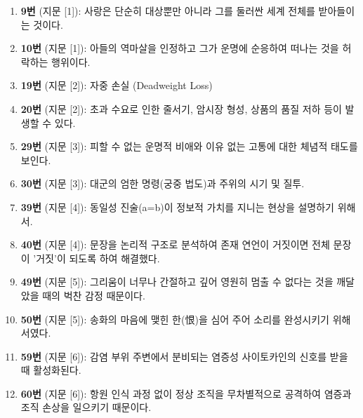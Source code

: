 \documentclass[10pt, a4paper]{article}
\begin{document}
\vspace{2mm}

\begin{enumerate}[label={}, leftmargin=0em, itemsep=2pt]
\item \textbf{9번} (지문 [1]): 사랑은 단순히 대상뿐만 아니라 그를 둘러싼 세계 전체를 받아들이는 것이다.
\item \textbf{10번} (지문 [1]): 아들의 역마살을 인정하고 그가 운명에 순응하여 떠나는 것을 허락하는 행위이다.
\item \textbf{19번} (지문 [2]): 자중 손실 (Deadweight Loss)
\item \textbf{20번} (지문 [2]): 초과 수요로 인한 줄서기, 암시장 형성, 상품의 품질 저하 등이 발생할 수 있다.
\item \textbf{29번} (지문 [3]): 피할 수 없는 운명적 비애와 이유 없는 고통에 대한 체념적 태도를 보인다.
\item \textbf{30번} (지문 [3]): 대군의 엄한 명령(궁중 법도)과 주위의 시기 및 질투.
\item \textbf{39번} (지문 [4]): 동일성 진술(a=b)이 정보적 가치를 지니는 현상을 설명하기 위해서.
\item \textbf{40번} (지문 [4]): 문장을 논리적 구조로 분석하여 존재 연언이 거짓이면 전체 문장이 '거짓'이 되도록 하여 해결했다.
\item \textbf{49번} (지문 [5]): 그리움이 너무나 간절하고 깊어 영원히 멈출 수 없다는 것을 깨달았을 때의 벅찬 감정 때문이다.
\item \textbf{50번} (지문 [5]): 송화의 마음에 맺힌 한(恨)을 심어 주어 소리를 완성시키기 위해서였다.
\item \textbf{59번} (지문 [6]): 감염 부위 주변에서 분비되는 염증성 사이토카인의 신호를 받을 때 활성화된다.
\item \textbf{60번} (지문 [6]): 항원 인식 과정 없이 정상 조직을 무차별적으로 공격하여 염증과 조직 손상을 일으키기 때문이다.
\end{enumerate}
\end{document}
